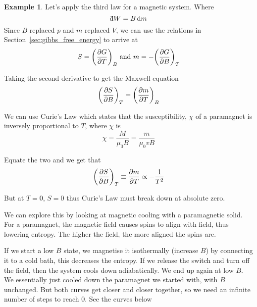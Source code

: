 \documentclass[12pt,chapterprefix=false,dvipsnames]{scrbook}
\theoremstyle{dotless}
\theoremstyle{definition}
\newtheorem{protoexample}{Example}[section]
\newenvironment{example}
{\colorlet{shadecolor}{red!15}\begin{shaded}\begin{protoexample}}
			{\end{protoexample}\end{shaded}}
\def\dbar{{\mathchar'26\mkern-10mu \mathrm{d}}}
\begin{document}
\begin{example}
	Let's apply the third law for a magnetic system. Where
	\begin{equation}
		\dbar W = B\dd{m}
	\end{equation}
	Since $B$ replaced $p$
	and $m$ replaced $V$, we
	can use the relations in Section~\ref{sec:gibbs_free_energy} to
	arrive at
	\begin{equation}
		S = {\left(\pdv{G}{T}\right)}_B\,\, \text{and}\,\,
		m = - {\left(\pdv{G}{B}\right)}_T
	\end{equation}

	Taking the second derivative to get the Maxwell equation
	\begin{equation}
		{\left(\pdv{S}{B}\right)}_T
			=
			{\left(\pdv{m}{T}\right)}_B
	\end{equation}

	We can use Curie's Law which states that the susceptibility,
	$\chi$ of a paramagnet is inversely
	proportional to $T$, where
	$\chi$ is
	\begin{equation}
		\chi = \frac{M}{\mu_0 B} = \frac{m}{\mu_0 vB}
	\end{equation}

	Equate the two and we get that
	\begin{equation}
		{\left(\pdv{S}{B}\right)}_T \equiv
		\pdv{m}{T} \propto -\frac{1}{T^2}
	\end{equation}

	But at $T = 0$, $S = 0$ thus
	Curie's Law must break down at absolute zero.

	We can explore this by looking at magnetic cooling with a
	paramagnetic solid. For a paramagnet, the magnetic field causes
	spins to align with field, thus lowering entropy. The higher the
	field, the more aligned the spins are.

	If we start a low $B$ state, we magnetise it
	isothermally (increase $B$) by connecting it
	to a cold bath, this decreases the entropy. If we release the
	switch and turn off the field, then the system cools down
	adiabatically. We end up again at low $B$.
	We essentially just cooled down the paramagnet we started with,
	with $B$ unchanged. But both curves get
	closer and closer together, so we need an infinite number of
	steps to reach 0. See the curves below

	\centering
	\label{fig:cooling_paramagnets} 
\end{example}
\end{document}
